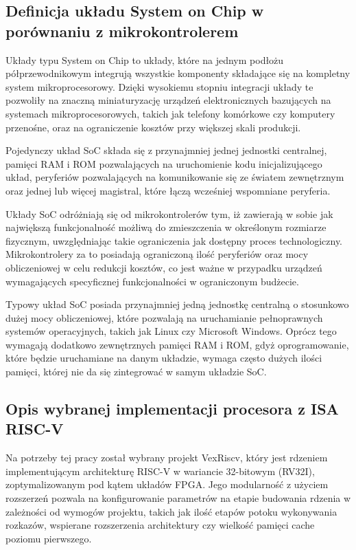 \subsection{Definicja układu System on Chip w porównaniu z mikrokontrolerem}

Układy typu System on Chip to układy, które na jednym podłożu półprzewodnikowym integrują wszystkie komponenty składające się na kompletny system mikroprocesorowy. Dzięki wysokiemu stopniu integracji układy te pozwoliły na znaczną miniaturyzację urządzeń elektronicznych bazujących na systemach mikroprocesorowych, takich jak telefony komórkowe czy komputery przenośne, oraz na ograniczenie kosztów przy większej skali produkcji.

Pojedynczy układ SoC składa się z przynajmniej jednej jednostki centralnej, pamięci RAM i ROM pozwalających na uruchomienie kodu inicjalizującego układ, peryferiów pozwalających na komunikowanie się ze światem zewnętrznym oraz jednej lub więcej magistral, które łączą wcześniej wspomniane peryferia.

Układy SoC odróżniają się od mikrokontrolerów tym, iż zawierają w sobie jak największą funkcjonalność możliwą do zmieszczenia w określonym rozmiarze fizycznym, uwzględniając takie ograniczenia jak dostępny proces technologiczny. Mikrokontrolery za to posiadają ograniczoną ilość peryferiów oraz mocy obliczeniowej w celu redukcji kosztów, co jest ważne w przypadku urządzeń wymagających specyficznej funkcjonalności w ograniczonym budżecie.

Typowy układ SoC posiada przynajmniej jedną jednostkę centralną o stosunkowo dużej mocy obliczeniowej, które pozwalają na uruchamianie pełnoprawnych systemów operacyjnych, takich jak Linux czy Microsoft Windows. Oprócz tego wymagają dodatkowo zewnętrznych pamięci RAM i ROM, gdyż oprogramowanie, które będzie uruchamiane na danym układzie, wymaga często dużych ilości pamięci, której nie da się zintegrować w samym układzie SoC.


\subsection{Opis wybranej implementacji procesora z ISA RISC-V}

Na potrzeby tej pracy został wybrany projekt VexRiscv\cite{vexriscv:2018:Online}, który jest rdzeniem implementującym architekturę RISC-V w wariancie 32-bitowym (RV32I), zoptymalizowanym pod kątem układów FPGA. Jego modularność z użyciem rozszerzeń pozwala na konfigurowanie parametrów na etapie budowania rdzenia w zależności od wymogów projektu, takich jak ilość etapów potoku wykonywania rozkazów, wspierane rozszerzenia architektury czy wielkość pamięci cache poziomu pierwszego.

